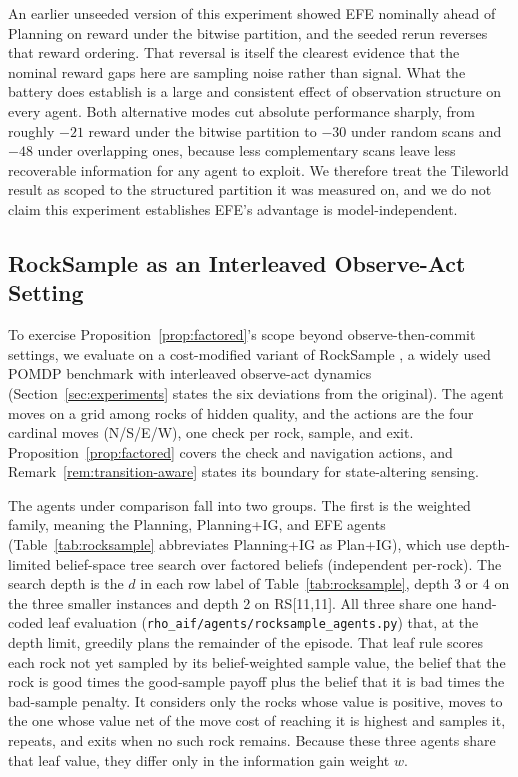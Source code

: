 An earlier unseeded version of this experiment showed EFE nominally ahead of Planning on reward under the bitwise partition, and the seeded rerun reverses that reward ordering. That reversal is itself the clearest evidence that the nominal reward gaps here are sampling noise rather than signal. What the battery does establish is a large and consistent effect of observation structure on every agent. Both alternative modes cut absolute performance sharply, from roughly $-21$ reward under the bitwise partition to $-30$ under random scans and $-48$ under overlapping ones, because less complementary scans leave less recoverable information for any agent to exploit. We therefore treat the Tileworld result as scoped to the structured partition it was measured on, and we do not claim this experiment establishes EFE's advantage is model-independent.

\subsection{RockSample as an Interleaved Observe-Act Setting}
\label{sec:rocksample}

To exercise Proposition~\ref{prop:factored}'s scope beyond observe-then-commit settings, we evaluate on a cost-modified variant of RockSample \citep{smith2004}, a widely used POMDP benchmark with interleaved observe-act dynamics (Section~\ref{sec:experiments} states the six deviations from the original). The agent moves on a grid among rocks of hidden quality, and the actions are the four cardinal moves (N/S/E/W), one check per rock, sample, and exit. Proposition~\ref{prop:factored} covers the check and navigation actions, and Remark~\ref{rem:transition-aware} states its boundary for state-altering sensing.

The agents under comparison fall into two groups. The first is the weighted family, meaning the Planning, Planning+IG, and EFE agents (Table~\ref{tab:rocksample} abbreviates Planning+IG as Plan+IG), which use depth-limited belief-space tree search over factored beliefs (independent per-rock). The search depth is the $d$ in each row label of Table~\ref{tab:rocksample}, depth 3 or 4 on the three smaller instances and depth 2 on RS[11,11]. All three share one hand-coded leaf evaluation (\texttt{rho\_\allowbreak aif/\allowbreak agents/\allowbreak rocksample\_\allowbreak agents.py}) that, at the depth limit, greedily plans the remainder of the episode. That leaf rule scores each rock not yet sampled by its belief-weighted sample value, the belief that the rock is good times the good-sample payoff plus the belief that it is bad times the bad-sample penalty. It considers only the rocks whose value is positive, moves to the one whose value net of the move cost of reaching it is highest and samples it, repeats, and exits when no such rock remains. Because these three agents share that leaf value, they differ only in the information gain weight $w$.

